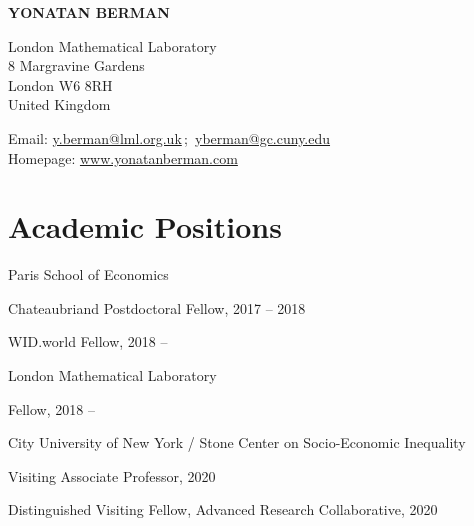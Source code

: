 \documentclass[10pt]{article}
\def\name{Yonatan Berman}
\renewenvironment{itemize}{
  \begin{list}{}{
      \setlength{\leftmargin}{1.0em}
      \setlength{\itemsep}{0.1em}
      \setlength{\parskip}{0pt}
      \setlength{\parsep}{0.2em}
    }
}{
  \end{list}
}
\renewcommand{\today}{\ifcase \month \or January\or February\or March\or April\or May%
\or June\or July\or August\or September\or October\or November\or December\fi%
\space \number \year}
\begin{document}
{\textbf{\large\MakeUppercase{Yonatan Berman}}}


\bigskip

\bigskip
\begin{minipage}[t]{0.495\textwidth}
  London Mathematical Laboratory \\
  8 Margravine Gardens \\
  London W6 8RH \\
  United Kingdom \\
\end{minipage}
\begin{minipage}[t]{0.495\textwidth}
  Email: \href{mailto:y.berman@lml.org.uk}{y.berman@lml.org.uk}\,;\,\,\,\href{mailto:yberman@gc.cuny.edu}{yberman@gc.cuny.edu}\\
  Homepage: \href{http://www.yonatanberman.com/}{www.yonatanberman.com}
\end{minipage}

\section*{Academic Positions}

\begin{itemize}
\item Paris School of Economics
  \begin{itemize}
  \item Chateaubriand Postdoctoral Fellow, 2017 -- 2018
  \item WID.world Fellow, 2018 --
  \end{itemize}
\item London Mathematical Laboratory
  \begin{itemize}
  \item Fellow, 2018 --
  \end{itemize}
\item City University of New York / Stone Center on Socio-Economic Inequality
  \begin{itemize}
  \item Visiting Associate Professor, 2020
  \item Distinguished Visiting Fellow, Advanced Research Collaborative, 2020
  \end{itemize}
\end{itemize}
\end{document}

